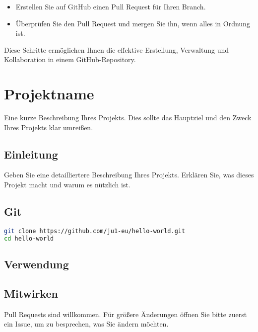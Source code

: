 \documentclass{vorlage-design-main}
\begin{document}
\begin{enumerate}
  \begin{itemize}
  
  \item
    Erstellen Sie auf GitHub einen Pull Request für Ihren Branch.
  \item
    Überprüfen Sie den Pull Request und mergen Sie ihn, wenn alles in
    Ordnung ist.
  \end{itemize}
\end{enumerate}

Diese Schritte ermöglichen Ihnen die effektive Erstellung, Verwaltung
und Kollaboration in einem GitHub-Repository.

\hypertarget{projektname}{%
\section{Projektname}\label{projektname}}

Eine kurze Beschreibung Ihres Projekts. Dies sollte das Hauptziel und
den Zweck Ihres Projekts klar umreißen.

\hypertarget{einleitung}{%
\subsection{Einleitung}\label{einleitung}}

Geben Sie eine detailliertere Beschreibung Ihres Projekts. Erklären Sie,
was dieses Projekt macht und warum es nützlich ist.

\hypertarget{git}{%
\subsection{Git}\label{git}}

\begin{lstlisting}[language=bash]
git clone https://github.com/ju1-eu/hello-world.git
cd hello-world
\end{lstlisting}

\hypertarget{verwendung}{%
\subsection{Verwendung}\label{verwendung}}

\hypertarget{mitwirken}{%
\subsection{Mitwirken}\label{mitwirken}}

Pull Requests sind willkommen. Für größere Änderungen öffnen Sie bitte
zuerst ein Issue, um zu besprechen, was Sie ändern möchten.
\end{document}
